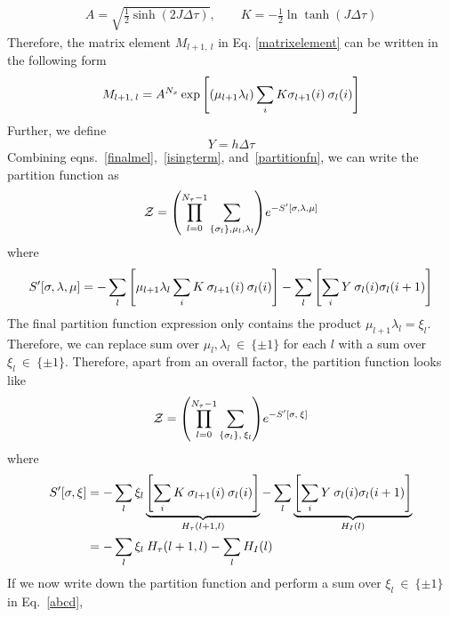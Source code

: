 \documentclass[../thesis_main.tex]{subfiles}
\begin{document}
\begingroup
\allowdisplaybreaks
\begin{align}
A = \sqrt{\frac{1}{2} \sinh(2 J\Delta \tau )}, \qquad K = -\frac{1}{2} \ln \tanh (J \Delta \tau)
\label{constants}
\end{align}
\endgroup
Therefore, the matrix element $M_{l+1, \:l}$ in Eq. \eqref{matrixelement} can be written in the following form
\begin{equation}
    M_{l+1, \: l} = A^{N_x} \exp \qty[(\mu_{l+1} \lambda_l)\sum_i K \sigma_{l+1}(i) \: \sigma_{l}(i)]
    \label{finalmel}
\end{equation}
Further, we define 
\begin{equation}
    Y = h \Delta \tau
\end{equation}
Combining eqns.~\eqref{finalmel},~\eqref{isingterm}, and~\eqref{partitionfn}, we can write the partition function as 
\begingroup
\allowdisplaybreaks
\begin{align}
    \mathcal{Z} = \qty(\prod_{l=0}^{N_\tau-1} \sum_{\{\sigma_l\}, \mu_l, \lambda_l}) e^{-S'[\sigma, \lambda, \mu]}
\end{align}
\endgroup
where 
\begingroup
\allowdisplaybreaks
\begin{align}
    S'[\sigma, \lambda, \mu] = - \sum_l \qty[\mu_{l+1} \lambda_l \sum_i K \: \sigma_{l+1}(i) \: \sigma_{l}(i)] - \sum_l\qty[\sum_i Y \: \sigma_l(i) \sigma_l (i+1)]
\end{align}
\endgroup
The final partition function expression only contains the product $\mu_{l+1} \lambda_l = \xi_l$. Therefore, we can replace sum over $\mu_l, \lambda_l \: \in \: \{\pm 1\}$ for each $l$ with a sum over $\xi_l \: \in \: \{\pm 1\}$. Therefore, apart from an overall factor, the partition function looks like 
\begin{equation}
    \mathcal{Z} = \qty(\prod_{l=0}^{N_\tau-1} \sum_{\{\sigma_l\}, \:\xi_l}) e^{-S'[\sigma, \: \xi]}
    \label{abcd}
\end{equation}
where 
\begingroup
\allowdisplaybreaks
\begin{align}
    S'[\sigma, \xi] & = - \sum_l \xi_l \underbrace{\qty[\sum_i K \: \sigma_{l+1}(i) \: \sigma_{l}(i)]}_{H_\tau(l+1, l)} - \sum_l \underbrace{\qty[\sum_i Y \: \sigma_l(i) \sigma_l (i+1)]}_{H_I(l)} \nonumber \\
    & = - \sum_l \xi_l \: H_\tau(l+1, l) - \sum_l H_I(l)
\end{align}
\endgroup
If we now write down the partition function and perform a sum over $\xi_l \: \in \: \{\pm 1\}$ in Eq.~\eqref{abcd},
\begingroup
\allowdisplaybreaks
\end{document}
